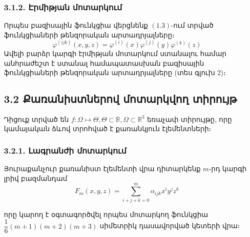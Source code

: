\documentclass[fleqn, bachelor,subf,12pt,notitlepage]{article}
\begin{document}
\subsubsection*{ {3.1.2. Էրմիթյան մոտարկում}}

{}
Որպես բազիսային ֆունկցիա վերցնենք $(1.3)$-ում տրված ֆունկցիաների թենզորական արտադրյալները։
\begin{equation}
			 \varphi^{(ijk)}\left(x,y,z\right)=\varphi^{(i)}(x)\varphi^{(j)}(y)\varphi^{(k)}(z)
\end{equation}
Ավելի բարձր կարգի էրմիթյան մոտարկում ստանալու համար անհրաժեշտ է ստանալ համապատասխան բազիսային ֆունկցիաների թենզորական արտադրյալները (տես գլուխ 2)։
\newpage
\subsection*{{3.2 Քառանիստներով մոտարկվող տիրույթ}}

Դիցուք տրված են $f:\Omega\mapsto \Theta, \Theta \subset \mathbb{R}, \Omega \subset \mathbb{R}^{3} $ եռաչափ տիրույթը, որը կամայական ձևով տրոհված է քառանկյուն էլեմենտների։


\subsubsection*{{3.2.1. Լագրանժի մոտարկում}}

Յուրաքանչուր քառանիստ էլեմենտի վրա դիտարկենք $m$-րդ կարգի լրիվ բազմանդամ
\begin{equation}
				F_{m}\left(x,y,z\right)=\sum_{i+j+k=0}^{m}\alpha_{ijk}x^{i}y^{j}z^{k}
\end{equation}

որը կարող է օգտագործվել որպես մոտարկող ֆունկցիա $\dfrac{1}{6}\left(m+1\right)\left(m+2\right)\left(m+3\right)$ սիմետրիկ դասավորված կետերի վրա։
\end{document}
